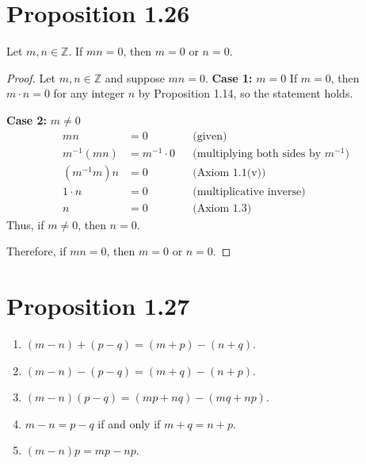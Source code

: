 \section*{Proposition 1.26}
Let $m, n \in \mathbb{Z}$. If $mn = 0$, then $m = 0$ or $n = 0$.
\begin{proof}
    Let $m, n \in \mathbb{Z}$ and suppose $mn = 0$.
    \textbf{Case 1:} $m = 0$
    If $m = 0$, then $m \cdot n = 0$ for any integer $n$ by Proposition 1.14, so the statement holds.

    \textbf{Case 2:} $m \neq 0$
    \begin{align*}
        mn         & = 0              &  & \text{(given)}                              \\
        m^{-1}(mn) & = m^{-1} \cdot 0 &  & \text{(multiplying both sides by $m^{-1}$)} \\
        (m^{-1}m)n & = 0              &  & \text{(Axiom 1.1(v))}                       \\
        1 \cdot n  & = 0              &  & \text{(multiplicative inverse)}             \\
        n          & = 0              &  & \text{(Axiom 1.3)}
    \end{align*}
    Thus, if $m \neq 0$, then $n = 0$.

    Therefore, if $mn = 0$, then $m = 0$ or $n = 0$.
\end{proof}

\section*{Proposition 1.27}
\begin{enumerate}[label=(\roman*)]
    \item $(m-n) + (p-q) = (m+p) - (n+q)$.
    \item $(m-n) - (p-q) = (m+q) - (n+p)$.
    \item $(m-n)(p-q) = (mp+nq) - (mq+np)$.
    \item $m-n = p-q$ if and only if $m+q = n+p$.
    \item $(m-n)p = mp - np$.
\end{enumerate}

